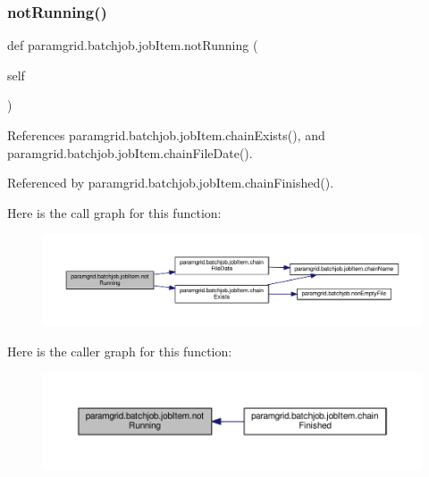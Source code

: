 \mbox{\label{classparamgrid_1_1batchjob_1_1jobItem_ac1129b5a9cac47d4044440c6f03eca75}} 
\subsubsection{\texorpdfstring{not\+Running()}{notRunning()}}
{\footnotesize\ttfamily def paramgrid.\+batchjob.\+job\+Item.\+not\+Running (\begin{DoxyParamCaption}\item[{}]{self }\end{DoxyParamCaption})}



References paramgrid.\+batchjob.\+job\+Item.\+chain\+Exists(), and paramgrid.\+batchjob.\+job\+Item.\+chain\+File\+Date().



Referenced by paramgrid.\+batchjob.\+job\+Item.\+chain\+Finished().

Here is the call graph for this function\+:
\nopagebreak
\begin{figure}[H]
\begin{center}
\leavevmode
\includegraphics[width=350pt]{classparamgrid_1_1batchjob_1_1jobItem_ac1129b5a9cac47d4044440c6f03eca75_cgraph}
\end{center}
\end{figure}
Here is the caller graph for this function\+:
\nopagebreak
\begin{figure}[H]
\begin{center}
\leavevmode
\includegraphics[width=350pt]{classparamgrid_1_1batchjob_1_1jobItem_ac1129b5a9cac47d4044440c6f03eca75_icgraph}
\end{center}
\end{figure}
\mbox{\label{classparamgrid_1_1batchjob_1_1jobItem_a324b9ccf7caf3955d49e423da96c6c8c}} 
